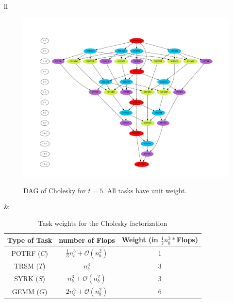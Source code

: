 \begin{frame}

\begin{tabular}{ll}
\begin{minipage}{5cm}
\begin{figure}
\begin{center}
\includegraphics[width=\textwidth]{dag-cholesky-5tile.pdf}\\
\caption{DAG of Cholesky for $t=5$. All tasks have unit weight.}
\end{center}
\end{figure}
\end{minipage}
&
\begin{minipage}{5cm}

\begin{table}[!t]
\tiny
\begin{tabular}{|c|c|c|}
  \hline
  Type of Task & number of Flops & Weight (in $\frac{1}{3}n_{b}^{3}*$Flops) \\
  \hline
  POTRF ($C$) & $\frac{1}{3}n_{b}^{3} + \mathcal{O}(n_{b}^{2})$ & 1 \\
  \hline
  TRSM ($T$)& $n_{b}^{3}$ & 3\\
    \hline
  SYRK ($S$)& $n_{b}^{3} + \mathcal{O}(n_{b}^{2})$ & 3 \\
    \hline
  GEMM ($G$)& $2n_{b}^{3} + \mathcal{O}(n_{b}^{2})$ & 6 \\
  \hline
\end{tabular}
\caption {Task weights for the Cholesky factorization}
\end{table}

\end{minipage}
\end{tabular}


\end{frame}


